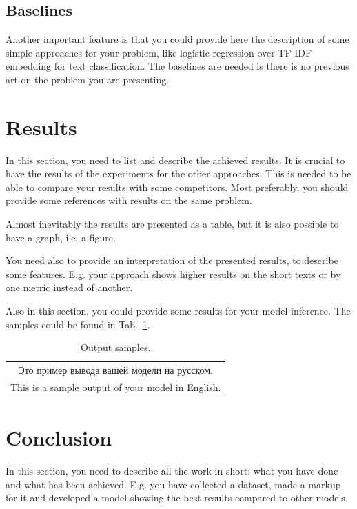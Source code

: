 \documentclass{article}
\begin{document}
\subsection{Baselines}
Another important feature is that you could provide here the description of some simple approaches for your problem, like logistic regression over TF-IDF embedding for text classification. The baselines are needed is there is no previous art on the problem you are presenting.

\section{Results}
In this section, you need to list and describe the achieved results. It is crucial to have the results of the experiments for the other approaches. This is needed to be able to compare your results with some competitors. Most preferably, you should provide some references with results on the same problem.

Almost inevitably the results are presented as a table, but it is also possible to have a graph, i.e. a figure.

You need also to provide an interpretation of the presented results, to describe some features. E.g. your approach shows higher results on the short texts or by one metric instead of another.

Also in this section, you could provide some results for your model inference. The samples could be found in Tab.~\ref{tab:output}.

\begin{table}[!tbh]
    \centering
    \begin{tabular}{|c|}
\hline
Это пример вывода вашей модели на русском.\\
This is a sample output of your model in English.
\\
\hline
    \end{tabular}
    \caption{Output samples.}
    \label{tab:output}
\end{table}

\section{Conclusion}
In this section, you need to describe all the work in short: what you have done and what has been achieved. E.g. you have collected a dataset, made a markup for it and developed a model showing the best results compared to other models. 



\end{document}

